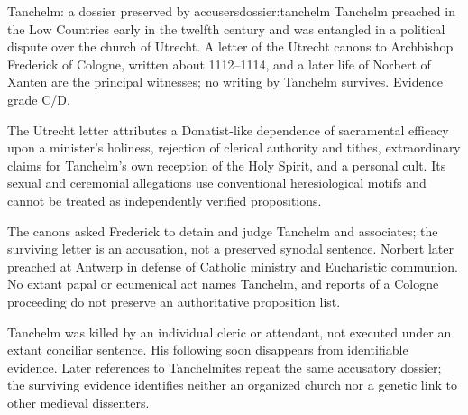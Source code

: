 \begin{heresydossier}{Tanchelm: a dossier preserved by accusers}{dossier:tanchelm}
\objectfield Tanchelm preached in the Low Countries early in the twelfth century and was entangled in a political dispute over the church of Utrecht. A letter of the Utrecht canons to Archbishop Frederick of Cologne, written about 1112--1114, and a later life of Norbert of Xanten are the principal witnesses; no writing by Tanchelm survives. Evidence grade C/D.

\propositionfield The Utrecht letter attributes a Donatist-like dependence of sacramental efficacy upon a minister's holiness, rejection of clerical authority and tithes, extraordinary claims for Tanchelm's own reception of the Holy Spirit, and a personal cult. Its sexual and ceremonial allegations use conventional heresiological motifs and cannot be treated as independently verified propositions.

\responsefield The canons asked Frederick to detain and judge Tanchelm and associates; the surviving letter is an accusation, not a preserved synodal sentence. Norbert later preached at Antwerp in defense of Catholic ministry and Eucharistic communion. No extant papal or ecumenical act names Tanchelm, and reports of a Cologne proceeding do not preserve an authoritative proposition list.

\aftermathfield Tanchelm was killed by an individual cleric or attendant, not executed under an extant conciliar sentence. His following soon disappears from identifiable evidence. Later references to Tanchelmites repeat the same accusatory dossier; the surviving evidence identifies neither an organized church nor a genetic link to other medieval dissenters.
\end{heresydossier}

